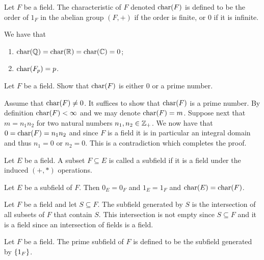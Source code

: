 \documentclass[11pt,a4paper]{article}
\begin{document}
\begin{definition}
  Let $F$ be a field.
  The characteristic of $F$ denoted $\text{char}(F)$ is defined to be the order
  of $1_F$ in the abelian group $(F,+)$ if the order is finite,
  or $0$ if it is infinite.
\end{definition}

\begin{example}
  We have that
  \begin{enumerate}
    \item[(1)] $\text{char}(\mathbb{Q}) = \text{char}(\mathbb{R}) = \text{char}(\mathbb{C}) = 0$;
    \item[(2)] $\text{char}(F_p) = p$.
  \end{enumerate}
\end{example}

\begin{exercise}
  Let $F$ be a field.
  Show that $\text{char}(F)$ is either $0$ or a prime number.
\end{exercise}
\begin{solution}
  Assume that $\text{char}(F) \neq 0$.
  It suffices to show that $\text{char}(F)$ is a prime number.
  By definition $\text{char}(F) < \infty$ and we may denote $\text{char}(F) = m$.
  Suppose next that $m = n_1 n_2$ for two natural numbers $n_1,n_2 \in \mathbb{Z}_+$.
  We now have that $0 = \text{char}(F) = n_1 n_2$ and since $F$ is a field
  it is in particular an integral domain and thus $n_1 = 0$ or $n_2 = 0$.
  This is a contradiction which completes the proof.
\end{solution}

\begin{definition}[Subfield]
  Let $E$ be a field.
  A subset $F \subseteq E$ is called a subfield if it is a field
  under the induced $(+,*)$ operations.
\end{definition}

\begin{proposition}
  Let $E$ be a subfield of $F$.
  Then $0_E = 0_F$ and $1_E = 1_F$ and $\text{char}(E) = \text{char}(F)$.
\end{proposition}

\begin{definition}
  Let $F$ be a field and let $S \subseteq F$.
  The subfield generated by $S$ is the intersection of all subsets of $F$
  that contain $S$.
  This intersection is not empty since $S \subseteq F$ and it is a field
  since an intersection of fields is a field.
\end{definition}

\begin{definition}
  Let $F$ be a field.
  The prime subfield of $F$ is defined to be the subfield generated
  by $\left\{1_F\right\}$.
\end{definition}
\end{document}
